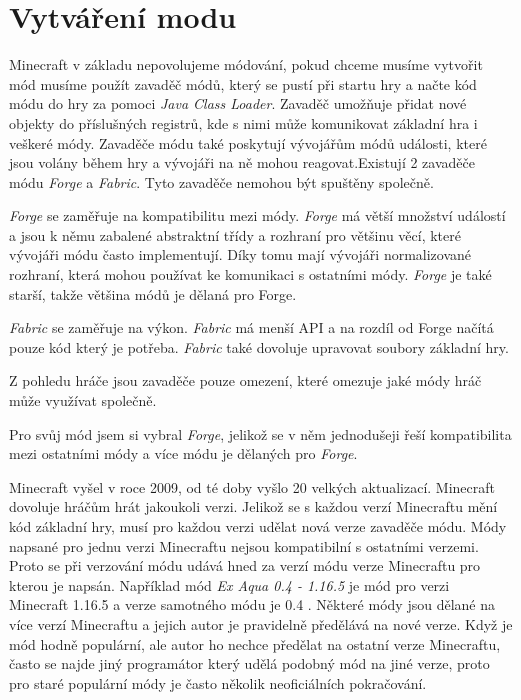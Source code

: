 \documentclass[FM,RP]{tulthesis}
\begin{document}
\chapter{Vytváření modu}
    Minecraft v základu nepovolujeme módování, pokud chceme musíme vytvořit mód musíme použít zavaděč módů, který se pustí při startu hry a načte kód módu do hry za pomoci \textit{Java Class Loader}. Zavaděč umožňuje přidat nové objekty do příslušných registrů, kde s nimi může komunikovat základní hra i veškeré módy.  Zavaděče módu také poskytují vývojářům módů události, které jsou volány během hry a vývojáři na ně mohou reagovat.Existují 2 zavaděče módu \textit{Forge} a \textit{Fabric}. Tyto zavaděče nemohou být spuštěny společně.
 \par   \textit{Forge} se zaměřuje na kompatibilitu mezi módy. \textit{Forge} má větší množství událostí a jsou k němu zabalené abstraktní třídy a rozhraní pro většinu věcí, které vývojáři módu často implementují. Díky tomu mají vývojáři normalizované rozhraní, která mohou používat ke komunikaci s ostatními módy. \textit{Forge} je také starší, takže většina módů je dělaná pro Forge.
\par    \textit{Fabric} se zaměřuje na výkon. \textit{Fabric} má menší API a na rozdíl od Forge načítá pouze kód který je potřeba. \textit{Fabric} také dovoluje upravovat soubory základní hry.
\par    Z pohledu hráče jsou zavaděče pouze omezení, které omezuje jaké módy hráč může využívat společně.
\par    Pro svůj mód jsem si vybral \textit{Forge}, jelikož se v něm jednodušeji řeší kompatibilita mezi ostatními módy a více módu je dělaných pro \textit{Forge}.
\par    Minecraft vyšel v roce 2009, od té doby vyšlo 20 velkých aktualizací. Minecraft dovoluje hráčům hrát jakoukoli verzi. Jelikož se s každou verzí Minecraftu mění kód základní hry, musí pro každou verzi udělat nová verze zavaděče módu. Módy napsané pro jednu verzi Minecraftu nejsou kompatibilní s ostatními verzemi. Proto se při verzování  módu udává hned za verzí módu verze Minecraftu pro kterou je napsán. Například mód\textit{ Ex Aqua 0.4 - 1.16.5}  je mód pro verzi Minecraft 1.16.5 a verze samotného módu je 0.4 . Některé módy jsou dělané na více verzí Minecraftu a jejich autor je pravidelně předělává na nové verze. Když je mód hodně populární, ale autor ho nechce předělat na ostatní verze Minecraftu, často se najde jiný programátor který udělá podobný mód na jiné verze, proto pro staré populární módy je často několik neoficiálních pokračování.   
\end{document}
